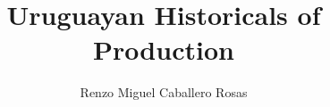 \documentclass[12pt]{article}
\theoremstyle{definition}
\theoremstyle{remark}
\begin{document}
\title{Uruguayan Historicals of Production}
\author{Renzo Miguel Caballero Rosas} 
\maketitle

\begin{figure}[ht!]
\centering
{}
\end{figure}
\begin{figure}[ht!]
\centering
{}
\end{figure}
\begin{figure}[ht!]
\centering
{}
\end{figure}
\begin{figure}[ht!]
\centering
{}
\end{figure}
\begin{figure}[ht!]
\centering
{}
\end{figure}
\begin{figure}[ht!]
\centering
{}
\end{figure}
\begin{figure}[ht!]
\centering
{}
\end{figure}
\begin{figure}[ht!]
\centering
{}
\end{figure}
\end{document}
